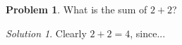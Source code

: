 \documentclass{article}
\theoremstyle{definition}
\newtheorem{problem}{Problem}
\theoremstyle{remark}
\newtheorem*{solution}{Solution}
\begin{document}
\begin{problem}
What is the sum of $2+2$?
\end{problem}
\begin{solution}
Clearly $2+2=4$, since...
\end{solution}
\end{document}
